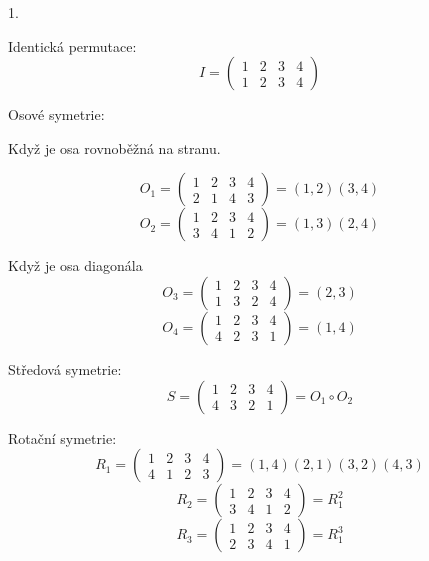 \documentclass[10pt,a4paper]{article}
\begin{document}
1.

Identická permutace:
\begin{equation*}
I =
\begin{pmatrix}
1 & 2 & 3 & 4 \\
1 & 2 & 3 & 4
\end{pmatrix} 
\end{equation*}


Osové symetrie:

Když je osa rovnoběžná na stranu.

\begin{equation*}
O_1 =
\begin{pmatrix}
1 & 2 & 3 & 4 \\
2 & 1 & 4 & 3
\end{pmatrix} = (1,2)(3,4)
\end{equation*}
\begin{equation*}
O_2 =
\begin{pmatrix}
1 & 2 & 3 & 4 \\
3 & 4 & 1 & 2
\end{pmatrix} = (1,3)(2,4)
\end{equation*}

Když je osa diagonála
\begin{equation*}
O_3 =
\begin{pmatrix}
1 & 2 & 3 & 4 \\
1 & 3 & 2 & 4
\end{pmatrix} = (2,3)
\end{equation*}
\begin{equation*}
O_4 =
\begin{pmatrix}
1 & 2 & 3 & 4 \\
4 & 2 & 3 & 1
\end{pmatrix} = (1,4)
\end{equation*}

Středová symetrie:
\begin{equation*}
S =
\begin{pmatrix}
1 & 2 & 3 & 4 \\
4 & 3 & 2 & 1
\end{pmatrix} = O_1 \circ O_2
\end{equation*}

Rotační symetrie:
\begin{equation*}
R_1 =
\begin{pmatrix}
1 & 2 & 3 & 4 \\
4 & 1 & 2 & 3
\end{pmatrix} = (1,4)(2,1)(3,2)(4,3)
\end{equation*}
\begin{equation*}
R_2 =
\begin{pmatrix}
1 & 2 & 3 & 4 \\
3 & 4 & 1 & 2
\end{pmatrix} = R_1^2
\end{equation*}
\begin{equation*}
R_3 =
\begin{pmatrix}
1 & 2 & 3 & 4 \\
2 & 3 & 4 & 1
\end{pmatrix} = R_1^3
\end{equation*}
\end{document}
